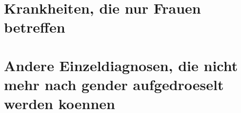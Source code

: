 \documentclass[11pt, a4paper]{scrartcl} %
\begin{document}





\section{Krankheiten, die nur Frauen betreffen}




\section{Andere Einzeldiagnosen, die nicht mehr nach gender aufgedroeselt werden koennen}









\end{document}

